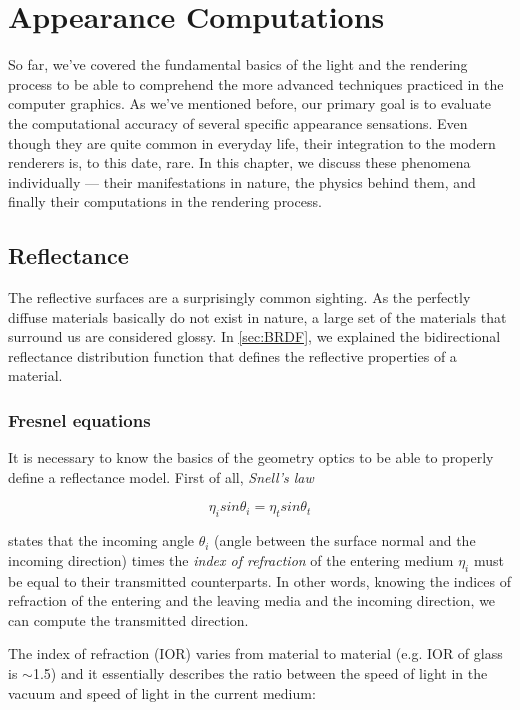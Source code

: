 \chapter{Appearance Computations}
\label{chap:appearance}

So far, we've covered the fundamental basics of the light and the rendering process to be able to comprehend the more advanced techniques practiced in the computer graphics. As we've mentioned before, our primary goal is to evaluate the computational accuracy of several specific appearance sensations. Even though they are quite common in everyday life, their integration to the modern renderers is, to this date, rare.  In this chapter, we discuss these phenomena individually --- their manifestations in nature, the physics behind them, and finally their computations in the rendering process. 

\section{Reflectance}

The reflective surfaces are a surprisingly common sighting. As the perfectly diffuse materials basically do not exist in nature, a large set of the materials that surround us are considered glossy. In \autoref{sec:BRDF}, we explained the bidirectional reflectance distribution function that defines the reflective properties of a material. 

\subsection{Fresnel equations}

It is necessary to know the basics of the geometry optics to be able to properly define a reflectance model. First of all,  \emph{Snell's law}~\cite{pharr2016physically}

\begin{equation}
\eta_i sin\theta_i = \eta_t sin\theta_t 
\end{equation}

states that the incoming angle $\theta_i$ (angle between the surface normal and the incoming direction) times the \emph{index of refraction} of the entering medium $\eta_i$ must be equal to their transmitted counterparts. In other words, knowing the indices of refraction of the entering and the leaving media and the incoming direction, we can compute the transmitted direction.

The index of refraction (IOR) varies from material to material (e.g. IOR of glass is $\sim$1.5) and it essentially describes the ratio between the speed of light in the vacuum and speed of light in the current medium: 

